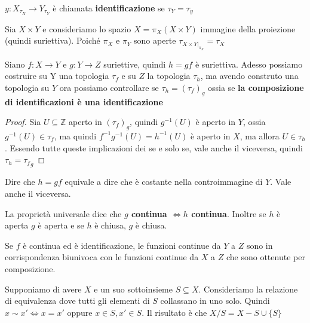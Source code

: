 \begin{definition}
    \(y : X_{\tau_X} \to  Y_{\tau_Y}\) è chiamata \textbf{identificazione} se
    \(\tau_Y = \tau_y\) 
\end{definition}
\begin{example}
    Sia \(X\times Y\) e consideriamo lo spazio \(X = \pi_X(X\times Y)\) immagine
della proiezione (quindi suriettiva). Poiché \(\pi_X\) e \(\pi_Y\) sono aperte
    \(\tau_{X \times Y|_{\pi_X}} = \tau_X\) 
\end{example}
\begin{proposition}
    Siano \(f: X \to Y\) e \(g: Y \to Z\) suriettive, quindi \(h = gf\) è
    suriettiva. Adesso possiamo costruire su Y una topologia \(\tau_f\) e su
    \(Z\) la topologia \(\tau_h\), ma avendo construto una topologia su \(Y\)
    ora possiamo controllare se \(\tau_h = {(\tau_f)}_g\) ossia se \textbf{la
    composizione di identificazioni è una identificazione}
\end{proposition}
\begin{proof}
    Sia \(U \subseteq \mathbb{Z} \) aperto in \((\tau_f)_g\), quindi
    \(g^{-1}(U)\) è aperto in \(Y\), ossia \( g^{-1}(U) \in \tau_f\), ma quindi
    \(f^{-1}g^{-1}(U) = h^{-1}(U)\) è aperto in \(X\), ma allora \(U \in
    \tau_h\). Essendo tutte queste implicazioni dei se e solo se, vale anche il
    viceversa, quindi \(\tau_h = {\tau_f}_g\) 
\end{proof}
\begin{proposition}
    Dire che \(h = gf\) equivale a dire che è costante nella controimmagine di
    \(Y\). Vale anche il viceversa.
    
    La proprietà universale dice che \textbf{\(g\) continua \(\iff h\)
    continua}. Inoltre se \(h\) è aperta \(g\) è aperta e se \(h\) è chiusa,
    \(g\) è chiusa.
\end{proposition}
\begin{proposition}
    Se \(f\) è continua ed è identificazione, le funzioni continue da \(Y\) a
    \(Z\) sono in corrispondenza biunivoca con le funzioni continue da \(X\) a
    \(Z\) che sono ottenute per composizione.
\end{proposition}
\begin{example}
    Supponiamo di avere \(X\) e un suo sottoinsieme \(S \subseteq X\).
    Consideriamo la relazione di equivalenza dove tutti gli elementi di \(S\)
    collassano in uno solo. Quindi \(x \sim x' \iff x = x'\) oppure \(x \in S,
    x' \in S\). Il risultato è che \(X / S= X - S \cup \{S\} \) 
\end{example}
